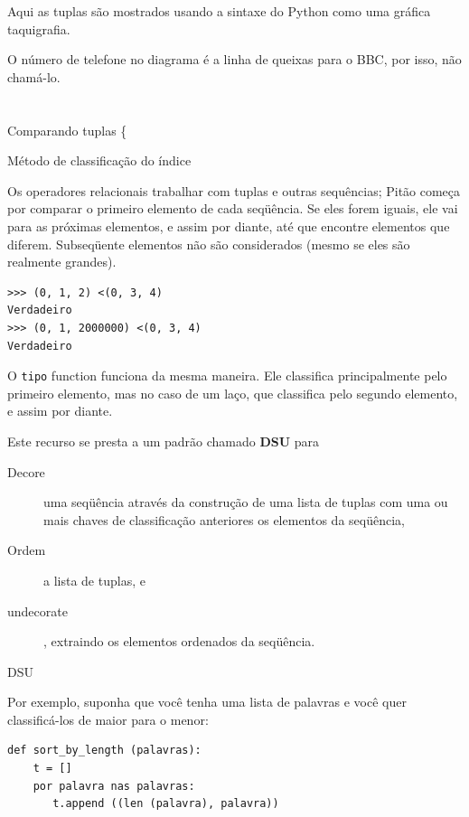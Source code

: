 \documentclass[10pt]{book}
\begin{document}
\begin{v erbatim}
{Aqui as tuplas são mostrados usando a sintaxe do Python como uma gráfica
taquigrafia.

O número de telefone no diagrama é a linha de queixas para o
BBC, por isso, não chamá-lo.



\section{} Comparando tuplas
\{} Método de classificação do índice

Os operadores relacionais trabalhar com tuplas e outras sequências;
Pitão começa por comparar o primeiro elemento de cada
seqüência. Se eles forem iguais, ele vai para as próximas elementos,
e assim por diante, até que encontre elementos que diferem. Subseqüente
elementos não são considerados (mesmo se eles são realmente grandes).

\begin{verbatim}
>>> (0, 1, 2) <(0, 3, 4)
Verdadeiro
>>> (0, 1, 2000000) <(0, 3, 4)
Verdadeiro
\end{verbatim}
%
O {\tt tipo} function funciona da mesma maneira. Ele classifica
principalmente pelo primeiro elemento, mas no caso de um laço, que classifica
pelo segundo elemento, e assim por diante.  

Este recurso se presta a um padrão chamado {\bf DSU} para 

\begin{description}

\item[Decore] uma seqüência através da construção de uma lista de tuplas
com uma ou mais chaves de classificação anteriores os elementos da seqüência,

\item[Ordem] a lista de tuplas, e

\item[undecorate], extraindo os elementos ordenados da seqüência.

\end{description}

\label{} DSU

Por exemplo, suponha que você tenha uma lista de palavras e você quer
classificá-los de maior para o menor:

\begin{verbatim}
def sort_by_length (palavras):
    t = []
    por palavra nas palavras:
       t.append ((len (palavra), palavra))


\end{verbatim}
\end{v erbatim}
\end{document}
